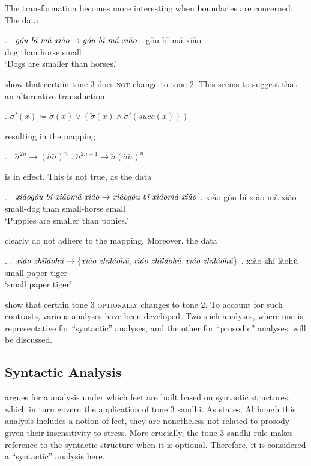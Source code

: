 \documentclass[12pt, a4paper]{report}
\newcommand{\textemph}[1]{\textsc{#1}}
\newcommand{\textform}[1]{\textit{#1}}
\newcommand{\textgls}[1]{`#1'}
\begin{document}
The transformation becomes more interesting when boundaries are
concerned.  The data

\ex.
\a. \(\text{\textform{gǒu bǐ mǎ xiǎo}} \to
\text{\textform{góu bǐ má xiǎo}}\)
\bg. gǒu bǐ mǎ xiǎo\\
dog than horse small\\
\trans\textgls{Dogs are smaller than horses.}

show that certain tone 3 does \textemph{not} change to tone 2.  This
seems to suggest that an alternative transduction

\ex. \(\acute{\sigma}'(x) \coloneq \acute{\sigma}(x) \lor
(\check{\sigma}(x) \land \check{\sigma}'(\mathit{succ}(x)))\)

resulting in the mapping

\ex.
\a. \(\check{\sigma}^{2n} \to (\acute{\sigma}\check{\sigma})^{n}\)
\b. \(\check{\sigma}^{2n+1} \to
\check{\sigma} (\acute{\sigma}\check{\sigma})^{n}\)

is in effect.  This is not true, as the data

\ex.
\a. \(\text{\textform{xiǎogǒu bǐ xiǎomǎ xiǎo}} \to
\text{\textform{xiáogóu bǐ xiáomá xiǎo}}\)
\bg. xiǎo-gǒu bǐ xiǎo-mǎ xiǎo\\
small-dog than small-horse small\\
\trans\textgls{Puppies are smaller than ponies.}

clearly do not adhere to the mapping.  Moreover, the data

\ex.
\a. \(\text{\textform{xiǎo zhǐlǎohǔ}} \to
\{\text{\textform{xiǎo zhíláohǔ}},
\text{\textform{xiáo zhǐláohǔ}},
\text{\textform{xiáo zhíláohǔ}}\}\)
\bg. xiǎo zhǐ-lǎohǔ\\
small paper-tiger\\
\trans\textgls{small paper tiger}

show that certain tone 3 \textemph{optionally} changes to tone 2.  To
account for such contrasts, various analyses have been developed.  Two
such analyses, where one is representative for \enquote{syntactic}
analyses, and the other for \enquote{prosodic} analyses, will be
discussed.

\subsection{Syntactic Analysis}
\textcite{c00tspcd} argues for a analysis under which feet are built
based on syntactic structures, which in turn govern the application of
tone 3 sandhi.  As \textcite{d07psc} states, Although this analysis
includes a notion of feet, they are nonetheless not related to prosody
given their insensitivity to stress.  More crucially, the tone 3
sandhi rule makes reference to the syntactic structure when it is
optional.  Therefore, it is considered a \enquote{syntactic} analysis
here.
\end{document}
